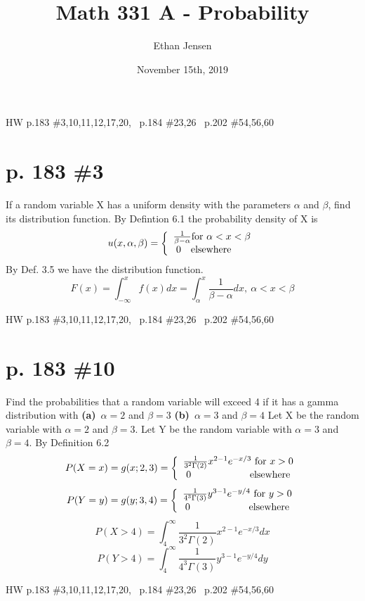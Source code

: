 \documentclass[12pt]{article}
\title{Math 331 A - Probability}
\author{Ethan Jensen}
\date{November 15th, 2019}
\begin{document}
	\maketitle HW p.183 \#3,10,11,12,17,20, \ p.184 \#23,26 \ p.202 \#54,56,60
	\section[20pt]{p. 183 \#3}
	If a random variable X has a uniform density with the parameters \(\alpha\) and \(\beta\), find its distribution function. \newline \newline
	By Defintion 6.1 the probability density of X is
	\[u(x,\alpha,\beta)=\left\{\begin{array}{ccc}
	\frac{1}{\beta-\alpha} \textup{for}\ \alpha<x<\beta\\0\ \ \  \textup{elsewhere}\ \ \ \ \ 
	\end{array}\right.\]
	By Def. 3.5 we have the distribution function.
	\[F(x)=\int_{-\infty}^xf(x)dx=\int_{\alpha}^{x}\frac{1}{\beta-\alpha}dx,\ \alpha<x<\beta\]
	\boxed{F(x)=\frac{x-\alpha}{\beta-\alpha},\ \alpha<x<\beta}
	\newpage
	\maketitle HW p.183 \#3,10,11,12,17,20, \ p.184 \#23,26 \ p.202 \#54,56,60
	\section[20pt]{p. 183 \#10}
	Find the probabilities that a random variable will exceed 4 if it has a gamma distribution with \newline
	\textbf{(a)}\ \(\alpha=2\) and \(\beta=3\) \newline
	\textbf{(b)}\ \(\alpha=3\) and \(\beta=4\) \newline
	\newline
	Let X be the random variable with  \(\alpha=2\) and \(\beta=3\). \newline
	Let Y be the random variable with  \(\alpha=3\) and \(\beta=4\). \newline
	By Definition 6.2
	\[P(X=x)=g(x;2,3)=\left\{\begin{array}{ccc}
	\frac{1}{3^2 \Gamma(2)}x^{2-1}e^{-x/3}\textup{ for }x>0\\0\ \ \ \ \ \ \ \ \ \ \ \ \ \ \ \ \ \  \textup{elsewhere}
	\end{array}\right.\]
	\[P(Y=y)=g(y;3,4)=\left\{\begin{array}{ccc}
	\frac{1}{4^3 \Gamma(3)}y^{3-1}e^{-y/4}\textup{ for }y>0\\0\ \ \ \ \ \ \ \ \ \ \ \ \ \ \ \ \ \  \textup{elsewhere}
	\end{array}\right.\]
	\[P(X>4)=\int_{4}^{\infty}\frac{1}{3^2 \Gamma(2)}x^{2-1}e^{-x/3}dx\]
	\[P(Y>4)=\int_{4}^{\infty}\frac{1}{4^3 \Gamma(3)}y^{3-1}e^{-y/4}dy\]
	\boxed{\textbf{(b)}\ P(X>4)=\frac{5}{2}e^{-1}\approx 0.91970}
	\newpage
	\maketitle HW p.183 \#3,10,11,12,17,20, \ p.184 \#23,26 \ p.202 \#54,56,60
\end{document}
